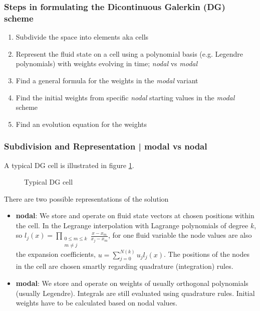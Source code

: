 
\subsubsection{Steps in formulating the Dicontinuous Galerkin (DG) scheme}
\begin{enumerate}
    \item Subdivide the space into elements aka cells
    \item Represent the fluid state on a cell using a polynomial basis (e.g. Legendre polynomials) with weights evolving in time; \textit{nodal} vs \textit{modal}
    \item Find a general formula for the weights in the \textit{modal} variant
    \item Find the initial weights from specific \textit{nodal} starting values in the \textit{modal} scheme
    \item Find an evolution equation for the weights
\end{enumerate}

\subsubsection{Subdivision and Representation | modal vs nodal}
A typical DG cell is illustrated in figure \ref{fig:dg_cell}.

\begin{figure}[!htb]
    \centering
    
    \caption{Typical DG cell}
    \label{fig:dg_cell}
\end{figure}

There are two possible representations of the solution
\begin{itemize}
    \item \textbf{nodal}: We store and operate on fluid state vectors at chosen positions within the cell. In the Legrange interpolation with Lagrange polynomials of degree $k$, so $l_j(x) = \prod_{\begin{array}{c} 0 \leq m \leq k \\ m \neq j \end{array}} \frac{x - x_m}{x_j - x_m}$, for one fluid variable the node values are also the expansion coefficients, $u = \sum_{j=0}^{N(k)} u_j l_j(x)$. The positions of the nodes in the cell are chosen smartly regarding quadrature (integration) rules.
    \item \textbf{modal}: We store and operate on weights of usually orthogonal polynomials (usually Legendre). Integrals are still evaluated using quadrature rules. Initial weights have to be calculated based on nodal values.
\end{itemize}

